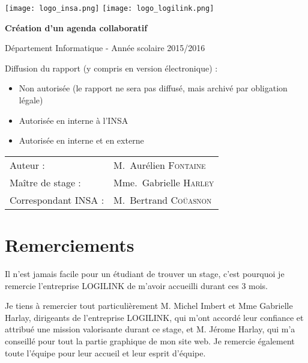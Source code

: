 \documentclass[a4paper, 11pt]{report}
\begin{document}
    \begin{titlepage}
        \texttt{[image: logo\_insa.png]}
        \hspace{0.35\textwidth}
        \texttt{[image: logo\_logilink.png]}
        \begin{center}
            \vspace{7cm}
            {\huge\bfseries Création d'un agenda collaboratif \par}
            \vspace{0.5cm}
            {\Large Département Informatique - Année scolaire 2015/2016\par}
        \end{center}
        \vfill

        Diffusion du rapport (y compris en version électronique) :

        \begin{itemize}[label=$\square$]
            \item Non autorisée (le rapport ne sera pas diffusé, mais archivé par obligation légale)
            \item Autorisée en interne à l’INSA
            \item Autorisée en interne et en externe
        \end{itemize}

        \vspace{0.5cm}

        \begin{tabular}{ll}
            {\Large Auteur :}             & M.~Aurélien \textsc{Fontaine}\\
            {\Large Maître de stage :}    & Mme.~Gabrielle \textsc{Harley}\\
            {\Large Correspondant INSA :} & M.~Bertrand \textsc{Coüasnon}\\
        \end{tabular}
    \end{titlepage}

\chapter*{Remerciements}

Il n'est jamais facile pour un étudiant de trouver un stage, c'est pourquoi je remercie l'entreprise LOGILINK de m'avoir accueilli durant ces 3 mois.

Je tiens à remercier tout particulièrement M. Michel Imbert et Mme Gabrielle Harlay, dirigeants de l'entreprise LOGILINK,  qui m'ont accordé leur confiance et attribué une mission valorisante durant ce stage, et M. Jérome Harlay, qui m'a conseillé pour tout la partie graphique de mon site web. Je remercie également toute l'équipe pour leur accueil et leur esprit d'équipe.
\end{document}
